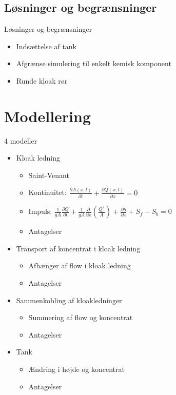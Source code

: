 \subsection{Løsninger og begrænsninger}
\begin{frame}{Løsninger og begrænsninger}{}
\vfill\vfill\centering
\begin{itemize}
	\item<1-> Indsættelse af tank
	\vspace{4mm}
	\item<2-> Afgrænse simulering til enkelt kemisk komponent
	\vspace{4mm}
	\item<3-> Runde kloak rør
\end{itemize}
\vfill\vfill	
\end{frame}

\section{Modellering}

\begin{frame}{4 modeller}{}
	\vfill\vfill\centering
\begin{itemize}
	\item<1-> Kloak ledning
	\begin{itemize}
		\item<2-> Saint-Venant
		\item<2-> Kontinuitet: \hspace{15mm} $\frac{\partial A(x,t)}{\partial t} + \frac{\partial Q(x,t)}{\partial x}=0$ 
		\item<2-> Impuls: \hspace{21mm} $\frac{1}{gA} \frac{\partial Q}{\partial t} +\frac{1}{gA}\frac{\partial}{\partial x} \left( \frac{Q^2}{A} \right) + \frac{\partial h}{\partial x} + S_f - S_b = 0$
		\item<2-> Antagelser
	\end{itemize}
	\vspace{4mm}
	\item<1-> Transport af koncentrat i kloak ledning
	\begin{itemize}
		\item<3-> Afhænger af flow i kloak ledning
		\item<3-> Antagelser
	\end{itemize}
	\vspace{4mm}
	\item<1-> Sammenkobling af kloakledninger
	\begin{itemize}
		\item<4-> Summering af flow og koncentrat
		\item<4-> Antagelser
	\end{itemize}
	\vspace{4mm}
	\item<1-> Tank
	\begin{itemize}
		\item<5-> Ændring i højde og koncentrat
		\item<5-> Antagelser
	\end{itemize}	 
\end{itemize}
\vfill\vfill		
\end{frame}

